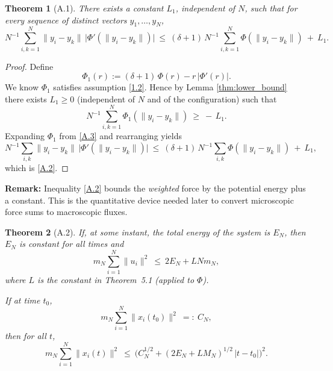 \documentclass[11pt]{article}
\newtheorem{theorem}{Theorem}
\begin{document}
\begin{theorem}[A.1]\label{thm:LNbound}
There exists a constant \(L_1\), independent of \(N\), such that for every sequence
of distinct vectors \(y_1,\dots,y_N\),
\begin{equation}
N^{-1}\sum_{i,k=1}^{N} \|y_i-y_k\|\,\big|\Phi'(\|y_i-y_k\|)\big|
\ \le\ 
(\delta+1)\,N^{-1}\sum_{i,k=1}^{N}\Phi(\|y_i-y_k\|)\ +\ L_1.
\label{A.2}\tag{A.2}
\end{equation}
\end{theorem}

\begin{proof}
Define
\begin{equation}
\Phi_1(r):=(\delta+1)\,\Phi(r)-r\,\big|\Phi'(r)\big|.
\label{A.3}\tag{A.3}
\end{equation}
We know \(\Phi_1\) satisfies assumption \eqref{1.2}.
Hence by Lemma \ref{thm:lower_bound} there exists \(L_1\ge 0\) (independent of \(N\) and of the configuration)
such that
\begin{equation}
N^{-1}\sum_{i,k=1}^{N}\Phi_1(\|y_i-y_k\|)\ \ge\ -\,L_1.
\label{A.4}\tag{A.4}
\end{equation}
Expanding \(\Phi_1\) from \eqref{A.3} and rearranging yields
\[\label{A.5}\tag{A.5}
N^{-1}\sum_{i,k} \|y_i-y_k\|\,\big|\Phi'(\|y_i-y_k\|)\big|
\ \le\ 
(\delta+1)\,N^{-1}\sum_{i,k}\Phi(\|y_i-y_k\|)\ +\ L_1,
\]
which is \eqref{A.2}.
\end{proof}

\textbf{Remark:}
Inequality \eqref{A.2} bounds the \emph{weighted} force by the potential energy plus a constant.
This is the quantitative device needed later to convert microscopic force sums to macroscopic fluxes.


\begin{theorem}[A.2]\label{thm:A.2}
If, at some instant, the total energy of the system is \(E_N\), then \(E_N\) is constant for all times and
\begin{equation}
m_ N\sum_{i=1}^{N}\|u_i\|^2\ \le\ 2E_N + LNm_N,
\label{A.6}\tag{A.6}
\end{equation}
where \(L\) is the constant in Theorem~5.1 (applied to \(\Phi\)).

If at time \(t_0\),
\begin{equation}
m_ N\sum_{i=1}^{N}\|x_i(t_0)\|^2\ =:\ C_N,
\label{A.7}\tag{A.7}
\end{equation}
then for all \(t\),
\begin{equation}
m_ N\sum_{i=1}^{N}\|x_i(t)\|^2
\ \le\ \Big(C_N^{1/2} + (2E_N+LM_N)^{1/2}\,|t-t_0|\Big)^2.
\label{A.8}\tag{A.8}
\end{equation}

\end{theorem}
\end{document}
